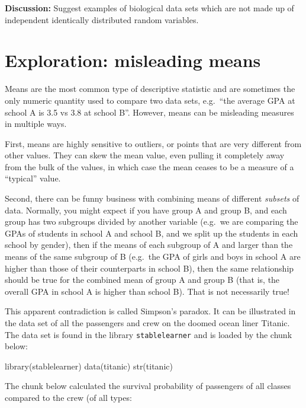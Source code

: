 \documentclass[
  letterpaper,
  DIV=11,
  numbers=noendperiod]{scrreprt}
\newenvironment{Shaded}{\begin{snugshade}}{\end{snugshade}}
\newcommand{\NormalTok}[1]{\textcolor[rgb]{0.00,0.23,0.31}{#1}}
\begin{document}
\textbf{Discussion:} Suggest examples of biological data sets which are
not made up of independent identically distributed random variables.

\section{Exploration: misleading
means}\label{exploration-misleading-means}

Means are the most common type of descriptive statistic and are
sometimes the only numeric quantity used to compare two data sets,
e.g.~``the average GPA at school A is 3.5 vs 3.8 at school B''. However,
means can be misleading measures in multiple ways.

First, means are highly sensitive to outliers, or points that are very
different from other values. They can skew the mean value, even pulling
it completely away from the bulk of the values, in which case the mean
ceases to be a measure of a ``typical'' value.

Second, there can be funny business with combining means of different
\emph{subsets} of data. Normally, you might expect if you have group A
and group B, and each group has two subgroups divided by another
variable (e.g.~we are comparing the GPAs of students in school A and
school B, and we split up the students in each school by gender), then
if the means of each subgroup of A and larger than the means of the same
subgroup of B (e.g.~the GPA of girls and boys in school A are higher
than those of their counterparts in school B), then the same
relationship should be true for the combined mean of group A and group B
(that is, the overall GPA in school A is higher than school B). That is
not necessarily true!

This apparent contradiction is called Simpson's paradox. It can be
illustrated in the data set of all the passengers and crew on the doomed
ocean liner Titanic. The data set is found in the library
\texttt{stablelearner} and is loaded by the chunk below:

\begin{Shaded}
\begin{Highlighting}[]
\NormalTok{library(stablelearner)}
\NormalTok{data(titanic)}
\NormalTok{str(titanic)}
\end{Highlighting}
\end{Shaded}

The chunk below calculated the survival probability of passengers of all
classes compared to the crew (of all types:
\end{document}
